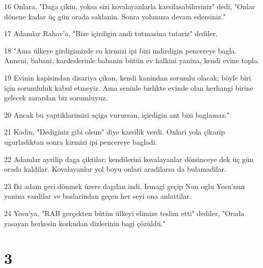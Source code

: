 \par 16 Onlara, "Daga çikin, yoksa sizi kovalayanlarla karsilasabilirsiniz" dedi, "Onlar dönene kadar üç gün orada saklanin. Sonra yolunuza devam edersiniz."
\par 17 Adamlar Rahav'a, "Bize içirdigin andi tutmasina tutariz" dediler,
\par 18 "Ama ülkeye girdigimizde su kirmizi ipi bizi indirdigin pencereye bagla. Anneni, babani, kardeslerinle babanin bütün ev halkini yanina, kendi evine topla.
\par 19 Evinin kapisindan disariya çikan, kendi kanindan sorumlu olacak; böyle biri için sorumluluk kabul etmeyiz. Ama seninle birlikte evinde olan herhangi birine gelecek zarardan biz sorumluyuz.
\par 20 Ancak bu yaptiklarimizi açiga vurursan, içirdigin ant bizi baglamaz."
\par 21 Kadin, "Dediginiz gibi olsun" diye karsilik verdi. Onlari yola çikarip ugurladiktan sonra kirmizi ipi pencereye bagladi.
\par 22 Adamlar ayrilip daga çiktilar; kendilerini kovalayanlar dönünceye dek üç gün orada kaldilar. Kovalayanlar yol boyu onlari aradilarsa da bulamadilar.
\par 23 Iki adam geri dönmek üzere dagdan indi. Irmagi geçip Nun oglu Yesu'nun yanina vardilar ve baslarindan geçen her seyi ona anlattilar.
\par 24 Yesu'ya, "RAB gerçekten bütün ülkeyi elimize teslim etti" dediler, "Orada yasayan herkesin korkudan dizlerinin bagi çözüldü."

\chapter{3}

